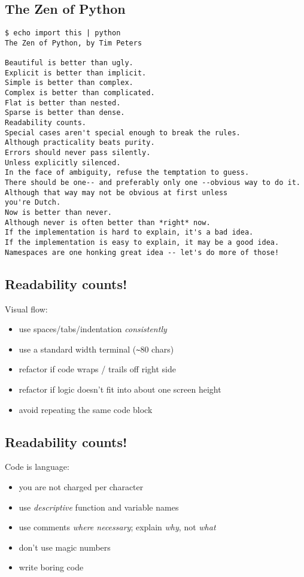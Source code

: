 \documentclass[xga]{xdvislides}
\newcommand{\smallish}{\fontsize{16}{16}\selectfont}
\begin{document}
\subsection{The Zen of Python}
\smallish
\begin{verbatim}
$ echo import this | python
The Zen of Python, by Tim Peters

Beautiful is better than ugly.
Explicit is better than implicit.
Simple is better than complex.
Complex is better than complicated.
Flat is better than nested.
Sparse is better than dense.
Readability counts.
Special cases aren't special enough to break the rules.
Although practicality beats purity.
Errors should never pass silently.
Unless explicitly silenced.
In the face of ambiguity, refuse the temptation to guess.
There should be one-- and preferably only one --obvious way to do it.
Although that way may not be obvious at first unless
you're Dutch.
Now is better than never.
Although never is often better than *right* now.
If the implementation is hard to explain, it's a bad idea.
If the implementation is easy to explain, it may be a good idea.
Namespaces are one honking great idea -- let's do more of those!
\end{verbatim}
\Normalsize

\subsection{Readability counts!}
Visual flow:
\begin{itemize}
	\item use spaces/tabs/indentation {\em consistently}
	\item use a standard width terminal (\verb+~+80 chars)
	\item refactor if code wraps / trails off right side
	\item refactor if logic doesn't fit into about one screen height
	\item avoid repeating the same code block
\end{itemize}

\subsection{Readability counts!}
Code is language:
\begin{itemize}
	\item you are not charged per character
	\item use {\em descriptive} function and variable names
	\item use comments {\em where necessary}; explain {\em why}, not {\em what}
	\item don't use magic numbers
	\item write boring code
\end{itemize}
\end{document}
